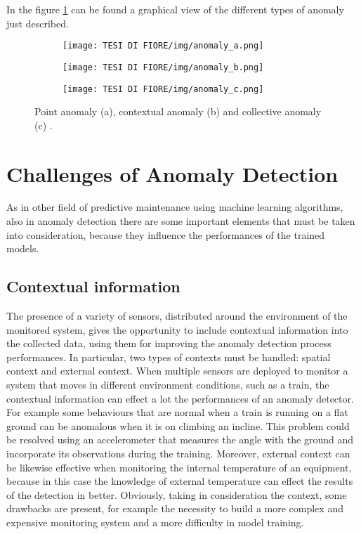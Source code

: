 In the figure \ref{anomalies} can be found a graphical view of the different types of anomaly just described. 
\begin{figure}[ht]
\centering
\begin{subfigure}
    \centering
    \texttt{[image: TESI DI FIORE/img/anomaly\_a.png]}
\end{subfigure}
\begin{subfigure}
    \centering
    \texttt{[image: TESI DI FIORE/img/anomaly\_b.png]}
\end{subfigure}
\begin{subfigure}
    \centering
    \texttt{[image: TESI DI FIORE/img/anomaly\_c.png]}
\end{subfigure}
\caption{Point anomaly (a), contextual anomaly (b) and collective anomaly (c) \cite{6AnomalyIoTTimeSeries}.}
\label{anomalies}
\end{figure}

\section{Challenges of Anomaly Detection}
As in other field of predictive maintenance using machine learning algorithms, also in anomaly detection there are some important elements that must be taken into consideration, because they influence the performances of the trained models.
\subsection{Contextual information}
The presence of a variety of sensors, distributed around the environment of the monitored system, gives the opportunity to include contextual information into the collected data, using them for improving the anomaly detection process performances. In particular, two types of contexts must be handled: spatial context and external context. When multiple sensors are deployed to monitor a system that moves in different environment conditions, such as a train, the contextual information can effect a lot the performances of an anomaly detector. For example some behaviours that are normal when a train is running on a flat ground can be anomalous when it is on climbing an incline. This problem could be resolved using an accelerometer that measures the angle with the ground and incorporate its observations during the training. Moreover, external context can be likewise effective when monitoring the internal temperature of an equipment, because in this case the knowledge of external temperature can effect the results of the detection in better. Obviously, taking in consideration the context, some drawbacks are present, for example the necessity to build a more complex and expensive monitoring system and a more difficulty in model training.
